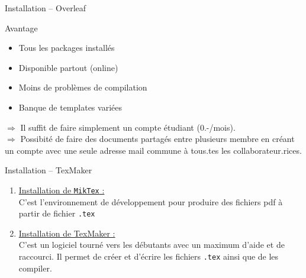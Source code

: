 \begin{frame}{Installation -- Overleaf}
    \begin{exampleblock}{Avantage}
        \begin{itemize}[label=$\triangleright$]
            \item Tous les packages installés
            \item Disponible partout (online)
            \item Moins de problèmes de compilation
            \item Banque de templates variées
        \end{itemize}
    \end{exampleblock}
    \bigskip
    $\Longrightarrow$ Il suffit de faire simplement un compte étudiant (0.-/mois). \\
    $\Longrightarrow$ Possibité de faire des documents partagés entre plusieurs membre en créant un compte avec une seule adresse mail commune à tous.tes les collaborateur.rices.
\end{frame}

\begin{frame}{Installation -- TexMaker}
    \begin{enumerate}
        \item \underline{Installation de \texttt{MikTex} :}  \\
        C'est l'environnement de développement pour produire des fichiers pdf à partir de fichier \texttt{.tex}
        \item \underline{Installation de TexMaker :}  \\
        C'est un logiciel tourné vers les débutants avec un maximum d'aide et de raccourci. Il permet de créer et d'écrire les fichiers \texttt{.tex} ainsi que de les compiler.
    \end{enumerate}
\end{frame}

